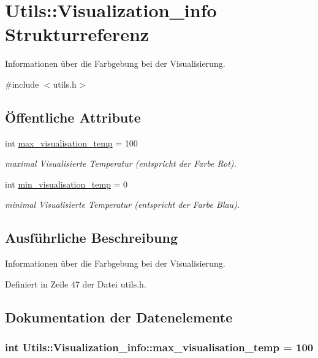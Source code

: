 \hypertarget{structUtils_1_1Visualization__info}{\section{Utils\-:\-:Visualization\-\_\-info Strukturreferenz}
\label{structUtils_1_1Visualization__info}
}


Informationen über die Farbgebung bei der Visualisierung.  




{\ttfamily \#include $<$utils.\-h$>$}

\subsection*{Öffentliche Attribute}
\begin{DoxyCompactItemize}
\item 
int \hyperlink{structUtils_1_1Visualization__info_a5327787a12634166ecc00f2224d3f39f}{max\-\_\-visualisation\-\_\-temp} = 100
\begin{DoxyCompactList}\small\item\em maximal Visualisierte Temperatur (entspricht der Farbe Rot). \end{DoxyCompactList}\item 
int \hyperlink{structUtils_1_1Visualization__info_a6e192352d1f00709f8ef963206ff2653}{min\-\_\-visualisation\-\_\-temp} = 0
\begin{DoxyCompactList}\small\item\em minimal Visualisierte Temperatur (entspricht der Farbe Blau). \end{DoxyCompactList}\end{DoxyCompactItemize}


\subsection{Ausführliche Beschreibung}
Informationen über die Farbgebung bei der Visualisierung. 

Definiert in Zeile 47 der Datei utils.\-h.



\subsection{Dokumentation der Datenelemente}
\hypertarget{structUtils_1_1Visualization__info_a5327787a12634166ecc00f2224d3f39f}{
\subsubsection[{max\-\_\-visualisation\-\_\-temp}]{\setlength{\rightskip}{0pt plus 5cm}int Utils\-::\-Visualization\-\_\-info\-::max\-\_\-visualisation\-\_\-temp = 100}}\label{structUtils_1_1Visualization__info_a5327787a12634166ecc00f2224d3f39f}


